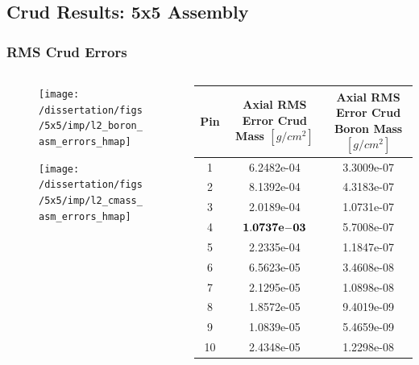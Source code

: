 \documentclass[t, pdftex]{beamer}
\begin{document}
\subsection*{Crud Results: 5x5 Assembly}
\begin{frame}
\frametitle{RMS Crud Errors}
\vspace{-42pt}
\begin{columns}
    \begin{column}{0.5\textwidth}
        \begin{figure}[H]%
            \texttt{[image: /dissertation/figs/5x5/imp/l2\_boron\_asm\_errors\_hmap]}
        \end{figure}
        \vspace{-38pt}
        \begin{figure}[H]%
            \texttt{[image: /dissertation/figs/5x5/imp/l2\_cmass\_asm\_errors\_hmap]}
        \end{figure}
    \end{column}
    \begin{column}{0.5\textwidth}
        \begin{table}[h]
            \tiny
            \begin{center}
                \begin{tabular}[h]{|c|C|C|}
                    \hline
                    Pin  & Axial RMS Error Crud Mass $[g/cm^2]$ & Axial RMS Error Crud Boron Mass $[g/cm^2]$ \\
                    \hline {}  & 6.2482e-04 &  3.3009e-07  \\
                    2  & 8.1392e-04 &  4.3183e-07  \\
                    3  & 2.0189e-04 &  1.0731e-07  \\
                    4  & $\mathbf{1.0737\mathrm{\bf e-}03}$ &  5.7008e-07  \\
                    5  & 2.2335e-04 &  1.1847e-07  \\
                    6  & 6.5623e-05 &  3.4608e-08  \\
                    7  & 2.1295e-05 &  1.0898e-08  \\
                    8  & 1.8572e-05 &  9.4019e-09  \\
                    9  & 1.0839e-05 &  5.4659e-09  \\
                    10 & 2.4348e-05 &  1.2298e-08  \\

\end{tabular}
\end{center}
\end{table}
\end{column}
\end{columns}
\end{frame}
\end{document}
